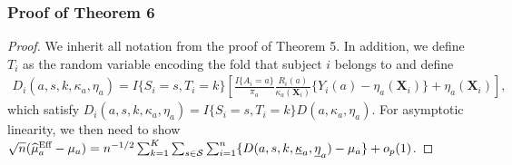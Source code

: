 \documentclass[12pt]{article}
\newcommand{\bX}{\boldsymbol{X}}
\begin{document}
\subsubsection{Proof of Theorem 6}
\begin{proof}
    We inherit all notation from the proof of Theorem 5. In addition, we define $T_i$ as the random variable encoding the fold that subject $i$ belongs to and define     
    \begin{align*}
        D_i(a,s,k,\kappa_a,\eta_a) = I\{S_i=s, T_i=k\} \left[\frac{I\{A_i=a\}}{\pi_a}\frac{R_i(a)}{\kappa_a(\bX_i)}\{Y_i(a)  - \eta_a(\bX_i)\} + \eta_a(\bX_i)\right],
    \end{align*}
    which satisfy $D_i(a,s,k,\kappa_a,\eta_a) = I\{S_i=s, T_i=k\} D(a, \kappa_a,\eta_a)$. 
    For asymptotic linearity, we then need to show $\sqrt{n}(\widehat{\mu}_a^{\textup{Eff}} - \mu_a) = n^{-1/2} \sum_{k=1}^K \sum_{s \in \mathcal{S}}\sum_{i=1}^n \{D(a, s,k,\underline{\kappa}_a,\underline{\eta}_a) - \mu_a\} + o_p(1)$. 


\end{proof}
\end{document}
